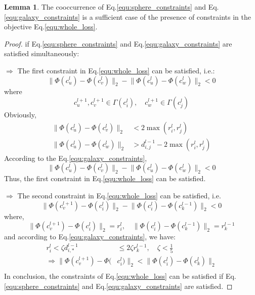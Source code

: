 \documentclass{article}
\theoremstyle{definition}
\newtheorem{lem}{Lemma}
\begin{document}
	 \begin{lem}
	 The cooccurrence of Eq.\ref{equ:sphere_constraints} and Eq.\ref{equ:galaxy_constraints} is a sufficient case of the presence of constraints in the objective Eq.\ref{equ:whole_loss}.
	 \end{lem}
	 \begin{proof}
	 if Eq.\ref{equ:sphere_constraints} and Eq.\ref{equ:galaxy_constraints} are satisfied simultaneously:

	 $\Rightarrow$ The first constraint in Eq.\ref{equ:whole_loss} can be satisfied, i.e.:
	 \[
	 	\lVert \Phi(c_u^{l}) - \Phi(c_v^{l})\rVert_2 - \lVert\Phi(c_u^{l}) - \Phi(c_w^{l})\rVert_2 < 0
	 \]
	 where
	 \[
	 	c_u^{l+1}, c_v^{l+1} \in \Gamma{(c_i^l)}, \quad c_w^{l+1} \in \Gamma{(c_j^l)}
	 \]
	 Obviously, 
	 \[
	 \begin{split}
	 	\lVert \Phi(c_u^{l}) - \Phi(c_v^{l})\rVert_2 &< 2\max{(r_i^l, r_j^l)} \\
	 	\lVert\Phi(c_u^{l}) - \Phi(c_w^{l})\rVert_2 &> d_{i, j}^{l-1} - 2\max{(r_i^l, r_j^l)} 
	 \end{split}
	 \]
	 According to the Eq.\ref{equ:galaxy_constraints},
	 \[
	 	\lVert \Phi(c_u^{l}) - \Phi(c_v^{l})\rVert_2 - \lVert\Phi(c_u^{l}) - \Phi(c_w^{l})\rVert_2 < 0
	 \]
	 Thus, the first constraint in Eq.\ref{equ:whole_loss} can be satisfied.

	 $\Rightarrow$ The second constraint in Eq.\ref{equ:whole_loss} can be satisfied, i.e.
	 \[
	 	\lVert\Phi(c_v^{l+1}) - \Phi(c_i^{l})\rVert_2 - \lVert\Phi(c_i^{l}) - \Phi(c_k^{l-1})\rVert_2 < 0
	 \]
	 where,
	 \[
	 	\lVert\Phi(c_v^{l+1}) - \Phi(c_i^{l})\rVert_2 = r_i^l, \quad \lVert\Phi(c_i^l) - \Phi(c_k^{l-1})\rVert_2 = r_k^{l-1}
	 \]
	 and according to Eq.\ref{equ:galaxy_constraints}, we have:
	 \[
	 	\begin{split}
	 	r_i^l < \zeta d_{i, *}^{l-1} &\leq 2\zeta r_k^{l-1}, \quad \zeta < \frac{1}{5} \\
	 	\Rightarrow \lVert\Phi(c_v^{l+1}) - \Phi(&c_i^{l})\rVert_2 < \lVert\Phi(c_i^{l}) - \Phi(c_k^{l})\rVert_2\\
	 	\end{split}
	 \]
	 In conclusion, the constraints of Eq.\ref{equ:whole_loss} can be satisfied if Eq.\ref{equ:sphere_constraints} and Eq.\ref{equ:galaxy_constraints} are satisfied.
	 \end{proof}

	
\end{document}
